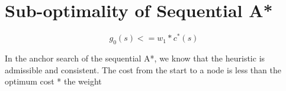 \section{Sub-optimality of Sequential A*}


\[ g_0(s) <= w_1 * c^*(s) \]

In the anchor search of the sequential A*, we know that the heuristic is admissible and consistent. The cost from the start to a node is less than the optimum cost * the weight